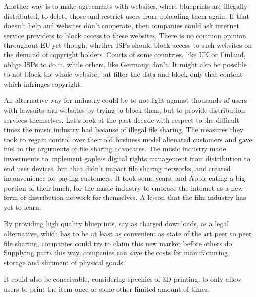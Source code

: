 Another way is to make agreements with websites, where blueprints are illegally distributed, to delete those and restrict users from uploading them again.
If that doesn't help and websites don't cooperate, then companies could ask internet service providers to block access to these websites.
There is no common opinion throughout EU yet though, whether ISPs should block access to such websites on the demand of copyright holders.
Courts of some countries, like UK or Finland, oblige ISPs to do it, while others, like Germany, don't.
It might also be possible to not block the whole website, but filter the data and block only that content which infringes copyright.

An alternative way for industry could be to not fight against thousands of users with lawsuits and websites by trying to block them, but to provide distribution services themselves.
Let's look at the past decade with respect to the difficult times the music industry had because of illegal file sharing.
The measures they took to regain control over their old business model alienated customers and gave fuel to the arguments of file sharing advocates.
The music industry made investments to implement gapless digital rights management from distribution to end user devices, but that didn't impact file sharing networks, and created inconvenience for paying customers.
It took some years, and Apple eating a big portion of their lunch, for the music industry to embrace the internet as a new form of distribution network for themselves.
A lesson that the film industry has yet to learn.

By providing high quality blueprints, say as charged downloads, as a legal alternative, which has to be at least as convenient as state of the art peer to peer file sharing, companies could try to claim this new market before others do.
Supplying parts this way, companies can save the costs for manufacturing, storage and shipment of physical goods.

It could also be conceivable, considering specifics of 3D-printing, to only allow users to print the item once or some other limited amount of times.
